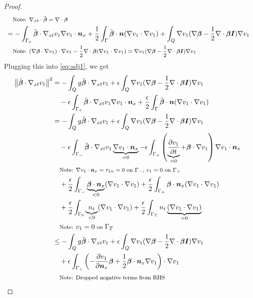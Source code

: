 \documentclass{article}
\theoremstyle{definition}
\theoremstyle{remark}
\begin{document}
\begin{proof}
\begin{align*}
&\quad\footnotesize{\text{Note: }\Divxt\tilde\bfbeta=\Div\bfbeta}
\\
%
&=-\int_{\Gamma_x}\tilde\bfbeta\cdot\Gradxt v_1\Grad v_1\cdot\bfn_x
+\frac{1}{2}\int_\Gamma\tilde\bfbeta\cdot\bfn(\Grad v_1\cdot\Grad v_1)
+\int_Q\Grad v_1(\Grad\bfbeta-\frac{1}{2}\Div\bfbeta\bfI)\Grad v_1\\
&\quad\footnotesize{\text{Note: }(\Grad\bfbeta\cdot\Grad v_1)\cdot\Grad v_1-\frac{1}{2}\Div\bfbeta(\Grad v_1\cdot\Grad v_1)=\Grad v_1(\Grad\bfbeta-\frac{1}{2}\Div\bfbeta\bfI)\Grad v_1}
\\
\end{align*}
Plugging this into \eqref{eq:adj1}, we get
\begin{align*}
\norm{\tilde\bfbeta\cdot\Gradxt v_1}^2
&=-\int_Q g\tilde\bfbeta\cdot\Gradxt v_1
+\epsilon\int_Q\Grad v_1(\Grad\bfbeta-\frac{1}{2}\Div\bfbeta\bfI)\Grad v_1\\
&\quad-\epsilon\int_{\Gamma_x}\tilde\bfbeta\cdot\Gradxt v_1\Grad v_1\cdot\bfn_x
+\frac{\epsilon}{2}\int_\Gamma\tilde\bfbeta\cdot\bfn(\Grad v_1\cdot\Grad v_1)\\
%
&=-\int_Q g\tilde\bfbeta\cdot\Gradxt v_1
+\epsilon\int_Q\Grad v_1(\Grad\bfbeta-\frac{1}{2}\Div\bfbeta\bfI)\Grad v_1\\
&\quad
-\epsilon\int_{\Gamma_-}\tilde\bfbeta\cdot\Gradxt v_1\underbrace{\Grad v_1\cdot\bfn_x}_{=0}
-\epsilon\int_{\Gamma_+}\LRp{\underbrace{\pd{v_1}{t}}_{=0}+\bfbeta\cdot\Grad v_1}\Grad v_1\cdot\bfn_x\\
&\quad\footnotesize{\text{Note: }\Grad v_1\cdot\bfn_x=\tau_{1n}=0\text{ on }\Gamma_-\text{, }v_1=0\text{ on }\Gamma_+}
\\
&\quad
+\frac{\epsilon}{2}\int_{\Gamma_-}\underbrace{\bfbeta\cdot\bfn_x}_{<0}(\Grad v_1\cdot\Grad v_1)
+\frac{\epsilon}{2}\int_{\Gamma_+}\bfbeta\cdot\bfn_x(\Grad v_1\cdot\Grad v_1)\\
&\quad
+\frac{\epsilon}{2}\int_{\Gamma_0}\underbrace{n_t}_{<0}(\Grad v_1\cdot\Grad v_1)
+\frac{\epsilon}{2}\int_{\Gamma_T}n_t\underbrace{(\Grad v_1\cdot\Grad v_1)}_{=0}\\
&\quad\footnotesize{\text{Note: }v_1=0\text{ on }\Gamma_T}
\\
%
&\leq-\int_Q g\tilde\bfbeta\cdot\Gradxt v_1
+\epsilon\int_Q\Grad v_1(\Grad\bfbeta-\frac{1}{2}\Div\bfbeta\bfI)\Grad v_1\\
&\quad
+\epsilon\int_{\Gamma_+}\LRp{-\pd{v_1}{\bfn_x}\bfbeta
+\frac{1}{2}\bfbeta\cdot\bfn_x\Grad v_1}\cdot\Grad v_1\\
&\quad\footnotesize{\text{Note: Dropped negative terms from RHS}}

\end{align*}
\end{proof}
\end{document}
